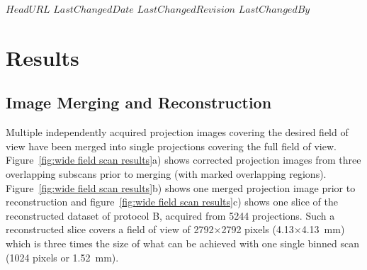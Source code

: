 \svnidlong
{$HeadURL$}
{$LastChangedDate$}
{$LastChangedRevision$}
{$LastChangedBy$}
%
%
\section{Results}%
\label{sec:Results}%
\subsection{Image Merging and Reconstruction}%
\label{sec:Image Merging and Reconstruction}%
Multiple independently acquired projection images covering the desired field of view have been merged into single projections covering the full field of view. Figure~\ref{fig:wide field scan results}a) shows corrected projection images from three overlapping subscans prior to merging (with marked overlapping regions). Figure~\ref{fig:wide field scan results}b) shows one merged projection image prior to reconstruction and figure~\ref{fig:wide field scan results}c) shows one slice of the reconstructed dataset of protocol B, acquired from 5244 projections. Such a reconstructed slice covers a field of view of 2792$\times$2792 pixels (4.13$\times$\SI{4.13}{\milli\meter}) which is three times the size of what can be achieved with one single binned scan (1024 pixels or \SI{1.52}{\milli\meter}). %

